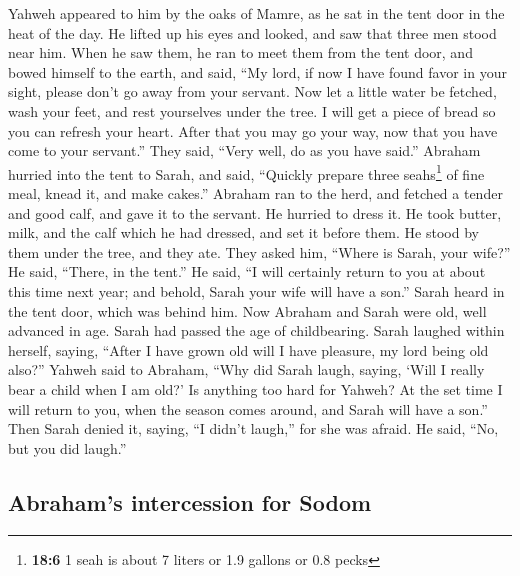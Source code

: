  Yahweh appeared to him by the oaks of Mamre, as he sat in
the tent door in the heat of the day.  He lifted up his
eyes and looked, and saw that three men stood near him. When he saw
them, he ran to meet them from the tent door, and bowed himself to the
earth,  and said, ``My lord, if now I have found favor in
your sight, please don't go away from your servant.  Now
let a little water be fetched, wash your feet, and rest yourselves under
the tree.  I will get a piece of bread so you can refresh
your heart. After that you may go your way, now that you have come to
your servant.'' They said, ``Very well, do as you have said.''
 Abraham hurried into the tent to Sarah, and said,
``Quickly prepare three seahs\footnote{\textbf{18:6} 1 seah is about 7
  liters or 1.9 gallons or 0.8 pecks} of fine meal, knead it, and make
cakes.''  Abraham ran to the herd, and fetched a tender
and good calf, and gave it to the servant. He hurried to dress it.
 He took butter, milk, and the calf which he had dressed,
and set it before them. He stood by them under the tree, and they ate.
 They asked him, ``Where is Sarah, your wife?'' He said,
``There, in the tent.''  He said, ``I will certainly
return to you at about this time next year; and behold, Sarah your wife
will have a son.'' Sarah heard in the tent door, which was behind him.
 Now Abraham and Sarah were old, well advanced in age.
Sarah had passed the age of childbearing.  Sarah laughed
within herself, saying, ``After I have grown old will I have pleasure,
my lord being old also?''  Yahweh said to Abraham, ``Why
did Sarah laugh, saying, `Will I really bear a child when I am old?'
 Is anything too hard for Yahweh? At the set time I will
return to you, when the season comes around, and Sarah will have a
son.''  Then Sarah denied it, saying, ``I didn't laugh,''
for she was afraid. He said, ``No, but you did laugh.''

\hypertarget{abrahams-intercession-for-sodom}{%
\subsection{Abraham's intercession for
Sodom}\label{abrahams-intercession-for-sodom}}

